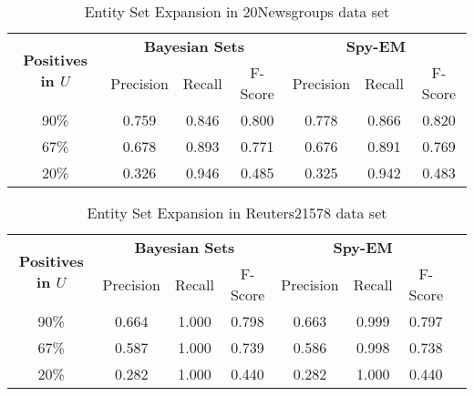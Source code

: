 \documentclass[12pt,twoside,notitlepage,amsart]{report} %
\begin{document}
	\begin{table}
	\begin{center}
	\caption{Entity Set Expansion in 20Newsgroups data set}
	
	\begin{tabular}{ |c| c|c|c|c | c | c |}
	
	\hline
	\multirow{2}{*}{\textbf{Positives in $U$}} & \multicolumn{3}{|c|}{\textbf{Bayesian Sets}} & \multicolumn{3}{|c|}{\textbf{Spy-EM}} \\\cline{2-7}
	
	
	& Precision & Recall & F-Score & Precision & Recall & F-Score \\
	
	\hline                        
	
	90\% & 0.759   & 0.846  &  0.800	&	 0.778  &  0.866  &  0.820 \\		
	67\% & 0.678   & 0.893  &  0.771	&	 0.676  &  0.891  &  0.769 \\
	20\% & 0.326   & 0.946  &  0.485 &  0.325  &  0.942  &  0.483 \\
	
	\hline  
	
	\end{tabular}
	\end{center}
	\end{table}
	
	\begin{table}
	\begin{center}
	
	\caption{Entity Set Expansion in Reuters21578 data set}
	
	
	\begin{tabular}{ |c| c|c|c|c | c | c | p}
	
	\hline
	
	\multirow{2}{*}{\textbf{Positives in $U$}} & \multicolumn{3}{|c|}{\textbf{Bayesian Sets}} & \multicolumn{3}{|c|}{\textbf{Spy-EM}} \\\cline{2-7}
	
	& Precision & Recall & F-Score & Precision & Recall & F-Score \\
	\hline                        
	90\% & 0.664 & 1.000 & 0.798 & 0.663 & 0.999 & 0.797 \\
	67\% & 0.587 & 1.000 & 0.739 & 0.586 & 0.998 & 0.738 \\
	20\% & 0.282 & 1.000 & 0.440 & 0.282 & 1.000 & 0.440 \\
	
	\hline  
	
	\end{tabular}
	
	\end{center}
	\end{table}
	
\end{document}
